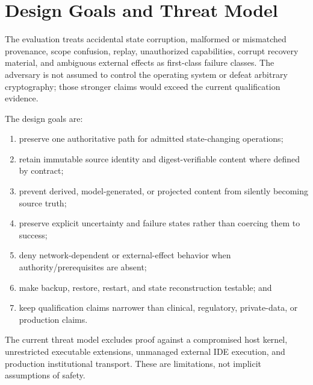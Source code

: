 \section{Design Goals and Threat Model}

The evaluation treats accidental state corruption, malformed or mismatched provenance, scope confusion, replay, unauthorized capabilities, corrupt recovery material, and ambiguous external effects as first-class failure classes. The adversary is not assumed to control the operating system or defeat arbitrary cryptography; those stronger claims would exceed the current qualification evidence.

The design goals are:
\begin{enumerate}
  \item preserve one authoritative path for admitted state-changing operations;
  \item retain immutable source identity and digest-verifiable content where defined by contract;
  \item prevent derived, model-generated, or projected content from silently becoming source truth;
  \item preserve explicit uncertainty and failure states rather than coercing them to success;
  \item deny network-dependent or external-effect behavior when authority/prerequisites are absent;
  \item make backup, restore, restart, and state reconstruction testable; and
  \item keep qualification claims narrower than clinical, regulatory, private-data, or production claims.
\end{enumerate}

The current threat model excludes proof against a compromised host kernel, unrestricted executable extensions, unmanaged external IDE execution, and production institutional transport. These are limitations, not implicit assumptions of safety.
